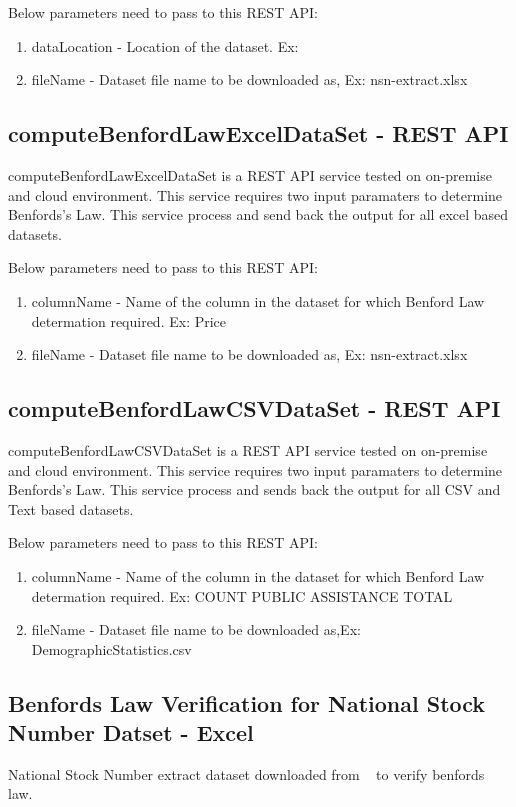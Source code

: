 Below parameters need to pass to this REST API:

\begin{enumerate}
\item dataLocation - Location of the dataset. 
 Ex:~\cite{hid-sp18-514-excelDatalocation}
\item fileName - Dataset file name to be downloaded 
 as, Ex: nsn-extract.xlsx
\end{enumerate}


\subsection{computeBenfordLawExcelDataSet - REST API}
computeBenfordLawExcelDataSet is a REST API service tested on 
on-premise and cloud environment. This service requires two 
input paramaters to determine Benfords's Law. This service
process and send back the output 
for all excel based datasets.

Below parameters need to pass to this REST API:

\begin{enumerate}
\item columnName - Name of the column in the 
 dataset for which Benford Law determation required. 
 Ex: Price
\item fileName - Dataset file name to be downloaded 
 as, Ex: nsn-extract.xlsx
\end{enumerate}

\subsection{computeBenfordLawCSVDataSet - REST API}
computeBenfordLawCSVDataSet is a REST API service 
tested on on-premise and cloud environment. 
This service requires two input paramaters to 
determine Benfords's Law. This service
process and sends back the output 
for all CSV and Text based datasets.

Below parameters need to pass to this REST API:

\begin{enumerate}
\item columnName - Name of the column in the 
 dataset for which Benford Law determation required. 
 Ex: COUNT PUBLIC ASSISTANCE TOTAL
\item fileName - Dataset file name to be downloaded 
 as,Ex: DemographicStatistics.csv
\end{enumerate}

\subsection{Benfords Law Verification for National Stock 
Number Datset - Excel}
National Stock Number extract dataset downloaded from 
~\cite{hid-sp18-514-nsn-ds-desc} to verify benfords law.

